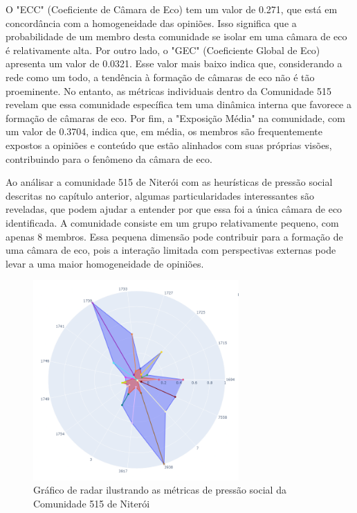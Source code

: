 O "ECC" (Coeficiente de Câmara de Eco) tem um valor de 0.271, que está em concordância com a homogeneidade das opiniões. Isso significa que a probabilidade de um membro desta comunidade se isolar em uma câmara de eco é relativamente alta. Por outro lado, o "GEC" (Coeficiente Global de Eco) apresenta um valor de 0.0321. Esse valor mais baixo indica que, considerando a rede como um todo, a tendência à formação de câmaras de eco não é tão proeminente. No entanto, as métricas individuais dentro da Comunidade 515 revelam que essa comunidade específica tem uma dinâmica interna que favorece a formação de câmaras de eco. Por fim, a "Exposição Média" na comunidade, com um valor de 0.3704, indica que, em média, os membros são frequentemente expostos a opiniões e conteúdo que estão alinhados com suas próprias visões, contribuindo para o fenômeno da câmara de eco.

Ao análisar a comunidade 515 de Niterói com as heurísticas de pressão social descritas no capítulo anterior, algumas particularidades interessantes são reveladas, que podem ajudar a entender por que essa foi a única câmara de eco identificada. A comunidade consiste em um grupo relativamente pequeno, com apenas 8 membros. Essa pequena dimensão pode contribuir para a formação de uma câmara de eco, pois a interação limitada com perspectivas externas pode levar a uma maior homogeneidade de opiniões.

\begin{figure}[htb]
	\centering
	\includegraphics[width=0.7\textwidth]{images/niteroi_community_515.png}
	\caption{Gráfico de radar ilustrando as métricas de pressão social da Comunidade 515 de Niterói}
	\label{fig:niteroi_community_515}
\end{figure}

